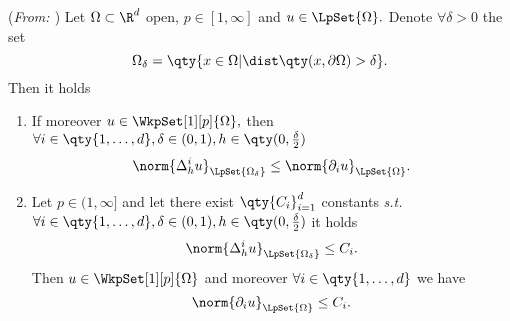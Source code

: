 \begin{theorem}(\textit{From: \cite{bulicekUvodModerniTeorie2018}})
	Let $\Omega \subset \R^{d}$ open, $p \in [1,\infty]$ and $u \in \LpSet{\Omega}.$ Denote $\forall \delta>0$ the set
	\[
		\Omega_{\delta} = \qty{x \in \Omega | \dist\qty(x, \partial \Omega)>\delta}.
	\]
	Then it holds

	\begin{enumerate}
		\item If moreover $u \in \WkpSet[1][p]{\Omega},$ then $\forall i \in \qty{1, \dots, d}, \delta \in (0,1), h \in \qty(0,\frac{\delta}{2})$
			\[
				\norm{\Delta_h^i u}_{\LpSet{\Omega_{\delta}}}\leq \norm{\partial_{i}u}_{\LpSet{\Omega}}.
			\]
		\item Let $p \in (1, \infty]$ and let there exist $\qty{C_i}_{i=1}^d$ constants \textit{s.t.} $\forall i \in \qty{1, \dots, d}, \delta \in (0,1), h \in \qty(0, \frac{\delta}{2})$ it holds
			\[
				\norm{\Delta_h^i u}_{\LpSet{\Omega_{\delta}}}\leq C_i.
			\]
			Then $u \in \WkpSet[1][p]{\Omega}$ and moreover $\forall i \in \qty{1, \dots, d}$ we have
			\[
				\norm{\partial_{i}u}_{\LpSet{\Omega}} \leq C_i.
			\]
	\end{enumerate}
\end{theorem}
